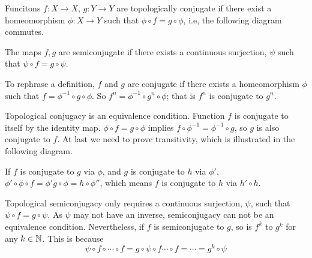 \begin{defn}
Funcitons $f: X \rightarrow X$, $g:  Y \rightarrow Y$ are topologically conjugate if there exist a homeomorphism $\phi: X \rightarrow Y$ such that 
$\phi \circ f = g \circ \phi$,
i.e, the following diagram commutes.
\begin{center}
\end{center}

The maps $f,g$ are semiconjugate if there exists a continuous surjection, $\psi$ such that $\psi \circ f = g \circ \psi$.
\end{defn}


To rephrase a definition, $f $ and $g$ are conjugate if there exists a homeomorphism $\phi$ such that $f = \phi^{-1} \circ g \circ \phi$.
So $f^{n} = \phi^{-1} \circ g^{n} \circ \phi$; that is $f^n$ is conjugate to $g^n$.

Topological conjugacy is an equivalence condition. 
Function $f$ is conjugate to itself by the identity map. 
$\phi \circ f = g \circ \phi$ implies $f \circ \phi^{-1} = \phi^{-1} \circ g$, so $g$ is also conjugate to $f$.
At last we need to prove transitivity, which is illustrated in the following diagram.
\begin{center}
\end{center}
If $f$  is conjugate to $g$ via $\phi$, and $g$ is conjugate to $h$ via $\phi'$, $\phi' \circ \phi \circ f = \phi' g \circ \phi = h \circ \phi'' $, which means $f$ is conjugate to $h$ via $h' \circ h$. 



Topological semiconjugacy only requires a continuous surjection, $\psi$, such that $\psi \circ f = g \circ \psi$. 
As $\psi$ may not have an inverse, semiconjugacy can not be an equivalence condition.
Nevertheless, if $f$ is semiconjugate to $g$, so is $f^{k}$ to $g^{k}$ for any $k \in \mathbb{N}$. 
This is because 
$$
	\psi \circ f\circ \cdots \circ f = g \circ \psi \circ f \cdots \circ f = \cdots = g^k \circ \psi
$$

